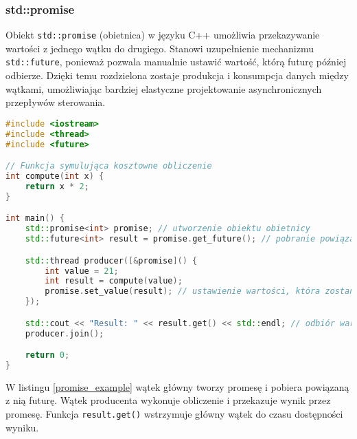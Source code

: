 \subsubsection{std::promise}
Obiekt \texttt{std::promise} (obietnica) w języku C++ umożliwia przekazywanie wartości z jednego wątku do drugiego. Stanowi uzupełnienie mechanizmu \texttt{std::future}, ponieważ pozwala manualnie ustawić wartość, którą futurę później odbierze. Dzięki temu rozdzielona zostaje produkcja i konsumpcja danych między wątkami, umożliwiając bardziej elastyczne projektowanie asynchronicznych przepływów sterowania.
\begin{lstlisting}[language=C++, style=VS2017,  caption={Przykład użycia std::promise}, label={promise_example}]
#include <iostream>
#include <thread>
#include <future>

// Funkcja symulująca kosztowne obliczenie
int compute(int x) {
    return x * 2;
}

int main() {
    std::promise<int> promise; // utworzenie obiektu obietnicy
    std::future<int> result = promise.get_future(); // pobranie powiązanego future

    std::thread producer([&promise]() {
        int value = 21;
        int result = compute(value);
        promise.set_value(result); // ustawienie wartości, która zostanie odebrana przez future
    });

    std::cout << "Result: " << result.get() << std::endl; // odbiór wartości, blokuje do czasu jej ustawienia
    producer.join();

    return 0;
}
\end{lstlisting}    
W listingu \ref{promise_example} wątek główny tworzy promesę i pobiera powiązaną z nią futurę. Wątek producenta wykonuje obliczenie i przekazuje wynik przez promesę. Funkcja \texttt{result.get()} wstrzymuje główny wątek do czasu dostępności wyniku.
